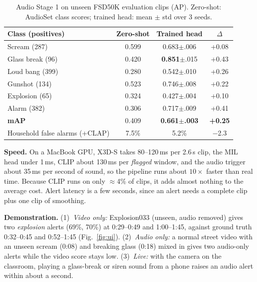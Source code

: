 \documentclass[conference,a4paper]{IEEEtran}
\begin{document}
\begin{table}[t]
\centering
\caption{Audio Stage 1 on unseen FSD50K evaluation clips (AP). Zero-shot: AudioSet class scores; trained head: mean $\pm$ std over 3 seeds.}
\label{tab:audio}
\footnotesize
\setlength{\tabcolsep}{4pt}
\begin{tabular}{@{}lccc@{}}
\toprule
Class (positives) & Zero-shot & Trained head & $\Delta$ \\
\midrule
Scream (287) & 0.599 & 0.683$\pm$.006 & +0.08 \\
Glass break (96) & 0.420 & \textbf{0.851}$\pm$.015 & +0.43 \\
Loud bang (399) & 0.280 & 0.542$\pm$.010 & +0.26 \\
Gunshot (134) & 0.523 & 0.746$\pm$.008 & +0.22 \\
Explosion (65) & 0.324 & 0.427$\pm$.004 & +0.10 \\
Alarm (382) & 0.306 & 0.717$\pm$.009 & +0.41 \\
\midrule
\textbf{mAP} & 0.409 & \textbf{0.661$\pm$.003} & \textbf{+0.25} \\
Household false alarms (+CLAP) & 7.5\% & 5.2\% & $-$2.3 \\
\bottomrule
\end{tabular}
\end{table}

\textbf{Speed.} On a MacBook GPU, X3D-S takes 80--120\,ms per 2.6\,s clip, the MIL head under 1\,ms, CLIP about
130\,ms per \emph{flagged} window, and the audio trigger about 35\,ms per second of sound, so the pipeline runs about
$10\times$ faster than real time. Because CLIP runs on only $\approx$4\% of clips, it adds almost nothing to the
average cost. Alert latency is a few seconds, since an alert needs a complete clip plus one clip of smoothing.

\textbf{Demonstration.} (1)~\emph{Video only:} Explosion033 (unseen, audio removed) gives two \emph{explosion}
alerts (69\%, 70\%) at 0:29--0:49 and 1:00--1:45, against ground truth 0:32--0:45 and 0:52--1:45 (Fig.~\ref{fig:ui}).
(2)~\emph{Audio only:} a normal street video with an unseen scream (0:08) and breaking glass (0:18) mixed in gives two
audio-only alerts while the video score stays low. (3)~\emph{Live:} with the camera on the classroom, playing a
glass-break or siren sound from a phone raises an audio alert within about a second.


\end{document}
